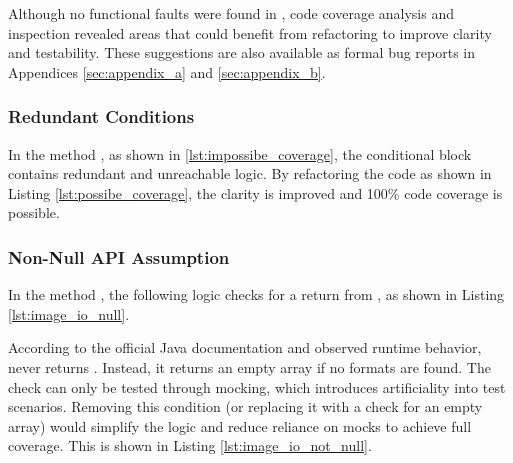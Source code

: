 \documentclass[12pt]{article}
\begin{document}
    Although no functional faults were found in ,
        code coverage analysis and inspection revealed areas that could benefit
        from refactoring to improve clarity and testability.
    These suggestions are also available as formal bug reports in Appendices
        \ref{sec:appendix_a} and \ref{sec:appendix_b}.

    \subsubsection{Redundant Conditions}

    In the method
        , as shown
        in \ref{lst:impossibe_coverage}, the conditional block contains
        redundant and unreachable logic.
    By refactoring the code as shown in Listing \ref{lst:possibe_coverage}, the
        clarity is improved and 100\% code coverage is possible.

    

    \subsubsection{Non-Null API Assumption}

    In the method , the following logic checks
        for a  return from , as
        shown in Listing \ref{lst:image_io_null}.

    

    According to the official Java documentation and observed runtime
        behavior,\\
         never returns .
    Instead, it returns an empty array if no formats are found.
    The  check can only be tested through mocking, which introduces
        artificiality into test scenarios.
    Removing this condition (or replacing it with a check for an empty array)
        would simplify the logic and reduce reliance on mocks to achieve full
        coverage.
    This is shown in Listing \ref{lst:image_io_not_null}.
\end{document}
